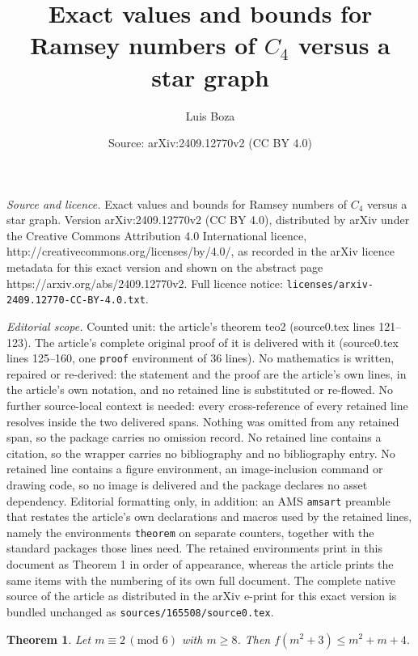 \documentclass[10pt,a4paper]{amsart}
\title{Exact values and bounds for Ramsey numbers of $C_4$ versus a star graph}
\author{Luis Boza}
\date{Source: arXiv:2409.12770v2 (CC BY 4.0)}
\newtheorem{theorem}{Theorem}
\begin{document}
\maketitle

\noindent\emph{Source and licence.} Exact values and bounds for Ramsey numbers of $C_4$ versus a star graph. Version arXiv:2409.12770v2 (CC BY 4.0), distributed by arXiv under the Creative Commons Attribution 4.0 International licence, http://creativecommons.org/licenses/by/4.0/, as recorded in the arXiv licence metadata for this exact version and shown on the abstract page https://arxiv.org/abs/2409.12770v2. Full licence notice: \texttt{licenses/arxiv-2409.12770-CC-BY-4.0.txt}.\par\smallskip

\noindent\textit{Editorial scope.} Counted unit: the article's theorem teo2 (source0.tex lines 121--123). The article's complete original proof of it is delivered with it (source0.tex lines 125--160, one \texttt{proof} environment of 36 lines). No mathematics is written, repaired or re-derived: the statement and the proof are the article's own lines, in the article's own notation, and no retained line is substituted or re-flowed.  No further source-local context is needed: every cross-reference of every retained line resolves inside the two delivered spans.  Nothing was omitted from any retained span, so the package carries no omission record.  No retained line contains a citation, so the wrapper carries no bibliography and no bibliography entry.  No retained line contains a figure environment, an image-inclusion command or drawing code, so no image is delivered and the package declares no asset dependency.  Editorial formatting only, in addition: an AMS \texttt{amsart} preamble that restates the article's own declarations and macros used by the retained lines, namely the environments \texttt{theorem} on separate counters, together with the standard packages those lines need.  The retained environments print in this document as Theorem 1 in order of appearance, whereas the article prints the same items with the numbering of its own full document.  The complete native source of the article as distributed in the arXiv e-print for this exact version is bundled unchanged as \texttt{sources/165508/source0.tex}.
\begin{theorem} \label{teo2}
Let $m\equiv 2 \,(\text{mod}\,\, 6)$ with $m\ge 8$. Then $f(m^2+3)\le m^2+m+4$.
\end{theorem}
\end{document}
